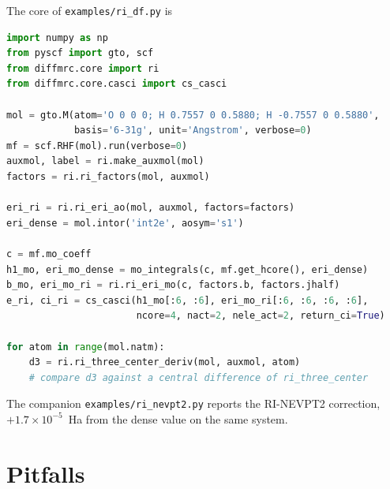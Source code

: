 The core of \texttt{examples/ri\_df.py} is

\begin{lstlisting}[language=Python]
import numpy as np
from pyscf import gto, scf
from diffmrc.core import ri
from diffmrc.core.casci import cs_casci

mol = gto.M(atom='O 0 0 0; H 0.7557 0 0.5880; H -0.7557 0 0.5880',
            basis='6-31g', unit='Angstrom', verbose=0)
mf = scf.RHF(mol).run(verbose=0)
auxmol, label = ri.make_auxmol(mol)
factors = ri.ri_factors(mol, auxmol)

eri_ri = ri.ri_eri_ao(mol, auxmol, factors=factors)
eri_dense = mol.intor('int2e', aosym='s1')

c = mf.mo_coeff
h1_mo, eri_mo_dense = mo_integrals(c, mf.get_hcore(), eri_dense)
b_mo, eri_mo_ri = ri.ri_eri_mo(c, factors.b, factors.jhalf)
e_ri, ci_ri = cs_casci(h1_mo[:6, :6], eri_mo_ri[:6, :6, :6, :6],
                       ncore=4, nact=2, nele_act=2, return_ci=True)

for atom in range(mol.natm):
    d3 = ri.ri_three_center_deriv(mol, auxmol, atom)
    # compare d3 against a central difference of ri_three_center
\end{lstlisting}

The companion \texttt{examples/ri\_nevpt2.py} reports the RI-NEVPT2
correction, $+1.7\times10^{-5}$~Ha from the dense value on the same
system.

\section{Pitfalls}
\label{sec:ri-pitfalls}

